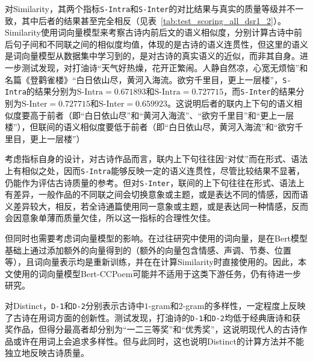 对Similarity，其两个指标\verb|S-Intra|和\verb|S-Inter|的对比结果与真实的质量等级并不一致，其中后者的结果甚至完全相反（见表~\ref{tab:test_scoring_all_dsr1_2}）。Similarity使用词向量模型来考察古诗内前后文的语义相似度，分别计算古诗中前后句子间和不同联之间的相似度均值，体现的是古诗的语义连贯性，但这里的语义是词向量模型从数据集中学习到的，是对古诗的真实语义的近似，而非其自身。进一步测试发现，对打油诗“{\kaishu 天气好热燥，花开正繁闹。人静自然凉，心宽无烦恼}”和名篇《登鹳雀楼》“{\kaishu 白日依山尽，黄河入海流。欲穷千里目，更上一层楼}”，\verb|S-Intra|的结果分别为$\text{S-Intra}=0.671893$和$\text{S-Intra}=0.727715$，而\verb|S-Inter|的结果分别为$\text{S-Inter}=0.727715$和$\text{S-Inter}=0.659923$。这说明后者的联内上下句的语义相似度要高于前者（即“{\kaishu 白日依山尽}”和“{\kaishu 黄河入海流}”、“{\kaishu 欲穷千里目}”和“{\kaishu 更上一层楼}”），但联间的语义相似度要低于前者（即“{\kaishu 白日依山尽，黄河入海流}”和“{\kaishu 欲穷千里目，更上一层楼}”）

考虑指标自身的设计，对古诗作品而言，联内上下句往往因“对仗”而在形式、语法上有相似之处，因而\verb|S-Intra|能够反映一定的语义连贯性，尽管比较结果不显著，仍能作为评估古诗质量的参考。但对\verb|S-Inter|，联间的上下句往往在形式、语法上有差异，一般作品的不同联之间会切换意象或主题，或是表达不同的情感，因而语义差异较大，相反，若全诗通篇使用同一意象或主题，或是表达同一种情感，反而会因意象单薄而质量欠佳，所以这一指标的合理性欠佳。

但同时也需要考虑词向量模型的影响。在过往研究中使用的词向量，是在Bert模型基础上通过添加额外的向量得到的（额外的向量包含情感、声调、节奏、位置等），且词向量表示均是重新训练，并在在计算Similarity时直接使用的。因此，本文使用的词向量模型Bert-CCPoem可能并不适用于这类下游任务，仍有待进一步研究。


对Distinct，\verb|D-1|和\verb|D-2|分别表示古诗中$1$-gram和$2$-gram的多样性，一定程度上反映了古诗在用词方面的创新性。测试发现，打油诗的\verb|D-1|和\verb|D-2|均低于经典唐诗和获奖作品，但得分最高者却分别为“一二三等奖”和“优秀奖”，这说明现代人的古诗作品或许在用词上会追求多样性。但与此同时，这也说明Distinct的计算方法并不能独立地反映古诗质量。

